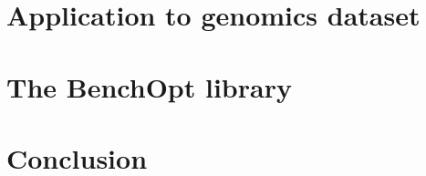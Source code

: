 \documentclass[a4paper, twoside]{memoir}
\begin{document}
\chapter{Application to genomics dataset} \label{chap:genom}



\chapter{The BenchOpt library}\label{chap:benchopt}


\chapter{Conclusion}


\printbibliography

\appendix


\end{document}
